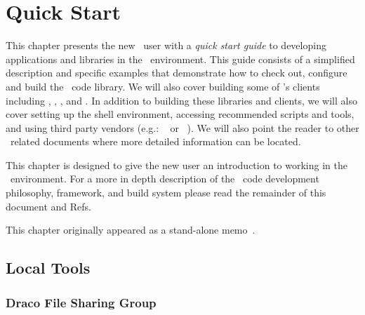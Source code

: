 
\newcommand{\wedgehog}{\sys{Wedgehog}}
\newcommand{\jayenne}{\sys{Jayenne}}
\newcommand{\gsl}{\soft{GSL}}
\newcommand{\openmpi}{\soft{OpenMPI}}
\newcommand{\emacs}{\soft{Emacs}}
\newcommand{\bash}{\soft{bash}}

\chapter{Quick Start}
\label{chap:quickstart}

This chapter presents the new \draco\ user with a
\emph{quick start guide} to developing applications and libraries in
the \draco\ environment.  This guide consists of a simplified
description and specific examples that demonstrate how to check out,
configure and build the \draco\ code library.  We will
also cover building some of \draco's clients including \clubimc,
\wedgehog, \milagro, and \capsaicin.  In addition to building these
libraries and clients, we will also cover setting up the shell
environment, accessing recommended scripts and tools, and using third
party vendors (e.g.: \gsl~\cite{gslref} or
\openmpi~\cite{openmpiweb}).  We will also point the reader to other
\draco\ related documents where more detailed information can be
located.

This chapter is designed to give the new user an introduction to
working in the \draco\ environment.  For a more in depth description
of the \draco\ code development philosophy, framework, and build
system please read the remainder of this document and Refs.~\cite{rn98046,draco-build,xtm:9909,doxygen,draco-purify,ccs-4:04-35,ccs-2:12-04}

This chapter originally appeared as a stand-alone memo~\cite{ccs2:12-16}.


\section{Local Tools}

\subsection{Draco File Sharing Group}

